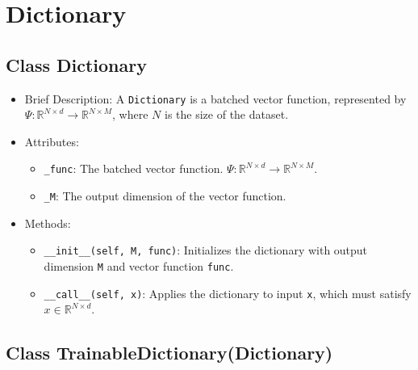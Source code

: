 

\section{Dictionary}
\subsection{Class Dictionary}

\begin{itemize}
\item Brief Description: A \lstinline|Dictionary| is a batched vector function,
  represented by $\Psi: \mathbb{R}^{N \times d} \rightarrow
  \mathbb{R}^{N \times M}$,
  where $N$ is the size of the dataset.
\item Attributes:
  \begin{itemize}
  \item \lstinline|_func|: The batched vector function.
  $\Psi: \mathbb{R}^{N \times d} \rightarrow \mathbb{R}^{N \times M}$.
  \item \lstinline|_M|: The output dimension of the vector function.
  \end{itemize}
\item Methods:
  \begin{itemize}
  \item \lstinline|__init__(self, M, func)|: Initializes the dictionary
  with output dimension \lstinline|M| and vector function \lstinline|func|.
  \item \lstinline|__call__(self, x)|: Applies the dictionary to input \lstinline|x|,
    which must satisfy $x \in \mathbb{R}^{N \times d}$.
  \end{itemize}
\end{itemize}

\subsection{Class TrainableDictionary(Dictionary)}

